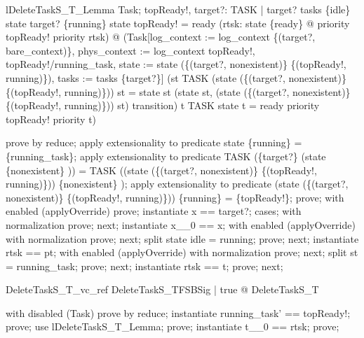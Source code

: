 \documentclass[a4paper, 12pt]{article}
\begin{document}
\begin{theorem}{lDeleteTaskS\_T\_Lemma}
\forall  Task; topReady!, target?: TASK | target? \in  tasks \setminus  \{idle\} \land  state target? \in  \{running\} \land  state topReady! = ready \land  (\forall  rtsk: state \inv  \limg  \{ready\} \rimg  @ priority topReady! \geq  priority rtsk) @ \lnot  (Task[log\_context := log\_context \oplus  \{(target?, bare\_context)\}, phys\_context := log\_context topReady!, topReady!/running\_task, state := state \oplus  (\{(target?, nonexistent)\} \cup  \{(topReady!, running)\}), tasks := tasks \setminus  \{target?\}] \land  (st \in  TASK \land  \lnot  (state \oplus  (\{(target?, nonexistent)\} \cup  \{(topReady!, running)\})) st = state st \implies  (state st, (state \oplus  (\{(target?, nonexistent)\} \cup  \{(topReady!, running)\})) st) \in  transition) \implies  t \in  TASK \land  state t = ready \land  \lnot  priority topReady! \geq  priority t)
\end{theorem}

\begin{zproof}
prove by reduce;
apply extensionality to predicate state \inv  \limg  \{running\} \rimg  = \{running\_task\};
apply extensionality to predicate TASK \setminus  (\{target?\} \cup  (state \inv  \limg  \{nonexistent\} \rimg )) = TASK \setminus  ((state \oplus  (\{(target?, nonexistent)\} \cup  \{(topReady!, running)\})) \inv  \limg  \{nonexistent\} \rimg );
apply extensionality to predicate (state \oplus  (\{(target?, nonexistent)\} \cup  \{(topReady!, running)\})) \inv  \limg  \{running\} \rimg  = \{topReady!\};
prove;
with enabled (applyOverride) prove;
instantiate x == target?;
cases;
with normalization prove;
next;
instantiate x\_\_0 == x;
with enabled (applyOverride) with normalization prove;
next;
split state idle = running;
prove;
next;
instantiate rtsk == pt;
with enabled (applyOverride) with normalization prove;
next;
split st = running\_task;
prove;
next;
instantiate rtsk == t;
prove;
next;
\end{zproof}

\begin{theorem}{DeleteTaskS\_T\_vc\_ref}
\forall  DeleteTaskS\_TFSBSig | true @ \pre  DeleteTaskS\_T
\end{theorem}

\begin{zproof}
with disabled (Task) prove by reduce;
instantiate running\_task' == topReady!;
prove;
use lDeleteTaskS\_T\_Lemma;
prove;
instantiate t\_\_0 == rtsk;
prove;
\end{zproof}
\end{document}
